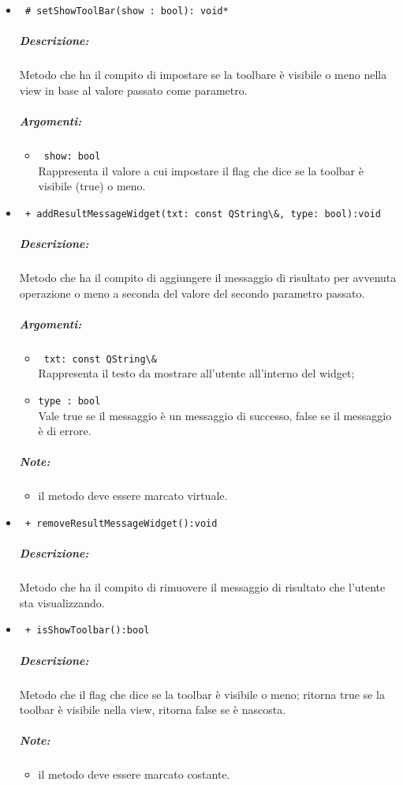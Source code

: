 \begin{itemize}
\item \color{blue} \verb! # setShowToolBar(show : bool): void*! \\
\color{black}
\subparagraph{Descrizione:} Metodo che ha il compito di impostare se la toolbare è visibile o meno nella view in base al valore passato come parametro.
\subparagraph{Argomenti:}
\begin{itemize}
\item \color{RoyalPurple} \verb! show: bool! \\Rappresenta il valore a cui impostare il flag che dice se la toolbar è visibile (true) o meno.
\end{itemize}

\item \color{blue} \verb! + addResultMessageWidget(txt: const QString\&, type: bool):void! \\
\color{black}
\subparagraph{Descrizione:} Metodo che ha il compito di aggiungere il messaggio di risultato per avvenuta operazione o meno a seconda del valore del secondo parametro passato.
\subparagraph{Argomenti:}
\begin{itemize}
\item \color{RoyalPurple} \verb! txt: const QString\& ! \\Rappresenta il testo da mostrare all'utente all'interno del widget;
\item \color{RoyalPurple} \verb!type : bool ! \\ Vale true se il messaggio è un messaggio di successo, false se il messaggio è di errore.
\end{itemize}
\subparagraph{Note:}
\begin{itemize}
\item il metodo deve essere marcato virtuale.
\end{itemize}

\item \color{blue} \verb! + removeResultMessageWidget():void! \\
\color{black}
\subparagraph{Descrizione:} Metodo che ha il compito di rimuovere il messaggio di risultato che l'utente sta visualizzando.

\item \color{blue} \verb! + isShowToolbar():bool! \\
\color{black}
\subparagraph{Descrizione:} Metodo che il flag che dice se la toolbar è visibile o meno; ritorna true se la toolbar è visibile nella view, ritorna false se è nascosta.
\subparagraph{Note:}
\begin{itemize}
\item il metodo deve essere marcato costante.
\end{itemize}


\end{itemize}
